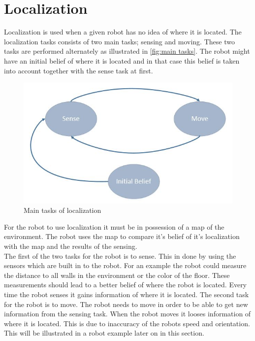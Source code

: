 
\section{Localization} %
\label{sec:localization}

Localization is used when a given robot has no idea of where it is located. The localization tasks consists of two main tasks; sensing and moving. These two tasks are performed alternately as illustrated in \autoref{fig:main tasks}. The robot might have an initial belief of where it is located and in that case this belief is taken into account together with the sense task at first.

\begin{figure}[h]
\centering
\includegraphics[scale=0.45]{images/SenseMoveInitialBelief}
\caption{Main tasks of localization}
\label{fig:main tasks}
\end{figure}

For the robot to use localization it must be in possession of a map of the environment. The robot uses the map to compare it's belief of it's localization with the map and the results of the sensing.\\

The first of the two tasks for the robot is to sense. This in done by using the sensors which are built in to the robot. For an example the robot could measure the distance to all walls in the environment or the color of the floor. These measurements should lead to a better belief of where the robot is located. Every time the robot senses it gains information of where it is located. The second task for the robot is to move. The robot needs to move in order to be able to get new information from the sensing task. When the robot moves it looses information of where it is located. This is due to inaccuracy of the robots speed and orientation. This will be illustrated in a robot example later on in this section.\\

